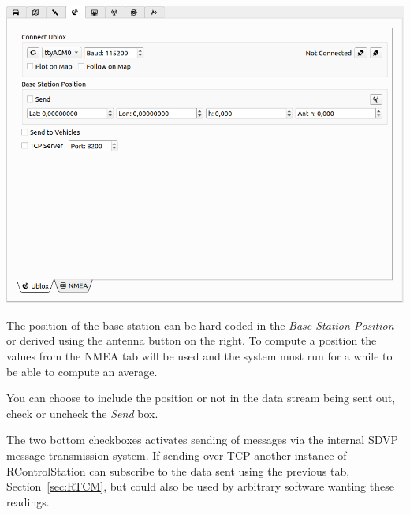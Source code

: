 \documentclass[12pt]{article} %
\begin{document}
\noindent\begin{minipage}{0.5\linewidth}
\noindent \includegraphics[width=\textwidth]{./screens/base_station_UBLOX.png}
\end{minipage}
\begin{minipage}{0.5\linewidth}
  The position of the base station can be hard-coded in the {\em Base
    Station Position} or derived using the antenna button on the
  right. To compute a position the values from the NMEA tab will be
  used and the system must run for a while to be able to compute an
  average.

  You can choose to include the position or not in the
  data stream being sent out, check or uncheck the {\em Send} box.

  The two bottom checkboxes activates sending of messages via the
  internal SDVP message transmission system. If sending over TCP
  another instance of RControlStation can subscribe to the data sent
  using the previous tab, Section~\ref{sec:RTCM}, but could also be
  used by arbitrary software wanting these readings.
\end{minipage}
\end{document}
